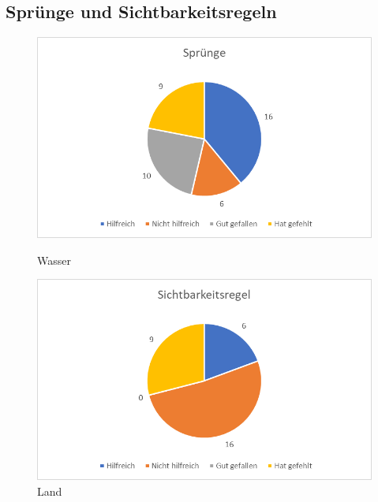 




\subsection{Sprünge und Sichtbarkeitsregeln}

\begin{figure}
   \begin{minipage}[b]{.49\linewidth} %
      \includegraphics[width=\linewidth]{pictures/diagramme/aussagenspr}
      \caption{Wasser}
   \end{minipage}
   \hspace{.01\linewidth}%
   \begin{minipage}[b]{.49\linewidth} %
      \includegraphics[width=\linewidth]{pictures/diagramme/aussagensichtb}
      \caption{Land}
   \end{minipage}
\end{figure}

